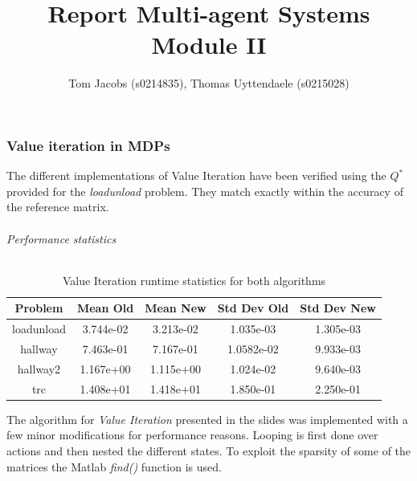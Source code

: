 \documentclass[10pt,a4paper]{article}
\title{Report Multi-agent Systems Module II}
\author{Tom Jacobs (s0214835), Thomas Uyttendaele (s0215028)}
\begin{document}
\maketitle
\part{}
\section{Value iteration in MDPs}
The different implementations of Value Iteration have been verified using the $Q^{*}$ provided for the \emph{loadunload} problem. They match exactly within the accuracy of the reference matrix.
\paragraph{Performance statistics}\hfill

\begin{table}[!h]
\centering
\begin{tabular}{ c || c | c || c | c}
Problem & Mean Old & Mean New & Std Dev Old & Std Dev New \\
\hline
loadunload & 3.744e-02 & 3.213e-02 & 1.035e-03 & 1.305e-03\\
hallway & 7.463e-01 & 7.167e-01 & 1.0582e-02 & 9.933e-03\\
hallway2 & 1.167e+00 & 1.115e+00 & 1.024e-02 & 9.640e-03 \\
trc & 1.408e+01 & 1.418e+01 & 1.850e-01 & 2.250e-01\\
\end{tabular}
\caption{Value Iteration runtime statistics for both algorithms}
\label{table:vi}
\end{table}

The algorithm for \emph{Value Iteration} presented in the slides was implemented with a few minor modifications for performance reasons. 
Looping is first done over actions and then nested the different states. To exploit the sparsity of some of the matrices the Matlab \emph{find()} function is used.
\end{document}
